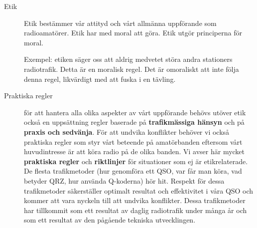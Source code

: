 \begin{description}
\item[Etik] Etik bestämmer vår attityd och vårt allmänna uppförande
  som radioamatörer.
  Etik har med moral att göra.
  Etik utgör principerna för moral.

  Exempel: etiken säger oss att aldrig medvetet störa andra stationers
  radiotrafik.
  Detta är en moralisk regel.
  Det är omoraliskt att inte följa denna regel, likvärdigt med att fuska i en
  tävling.
\item[Praktiska regler] för att hantera alla olika aspekter av
  vårt uppförande behövs utöver etik också en uppsättning regler baserade på
  \textbf{trafikmässiga hänsyn} och på \textbf{praxis och sedvänja}.
  För att undvika konflikter behöver vi också praktiska regler som styr
  vårt beteende på amatörbanden eftersom vårt huvudintresse är att köra
  radio på de olika banden.
  Vi avser här mycket \textbf{praktiska regler} och \textbf{riktlinjer} för
  situationer som ej är etikrelaterade.
  De flesta trafikmetoder (hur genomföra ett QSO, var får man köra,
  vad betyder QRZ, hur använda Q-koderna) hör hit.
  Respekt för dessa trafikmetoder säkerställer optimalt resultat och
  effektivitet i våra QSO och kommer att vara nyckeln till att undvika
  konflikter.
  Dessa trafikmetoder har tillkommit som ett resultat av daglig radiotrafik
  under många år och som ett resultat av den pågående tekniska utvecklingen.
\end{description}

